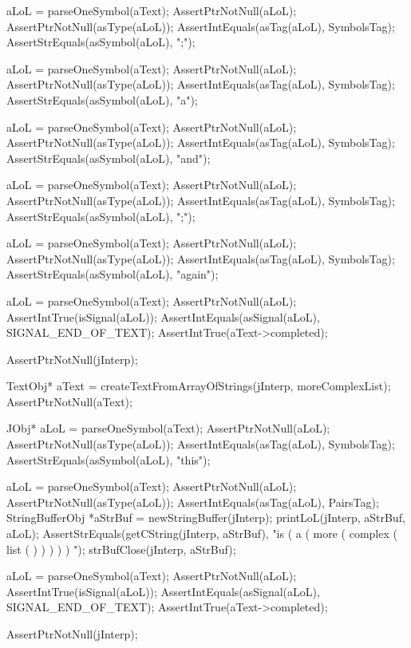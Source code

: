   aLoL = parseOneSymbol(aText);
  AssertPtrNotNull(aLoL);
  AssertPtrNotNull(asType(aLoL));
  AssertIntEquals(asTag(aLoL), SymbolsTag);
  AssertStrEquals(asSymbol(aLoL), ";");

  aLoL = parseOneSymbol(aText);
  AssertPtrNotNull(aLoL);
  AssertPtrNotNull(asType(aLoL));
  AssertIntEquals(asTag(aLoL), SymbolsTag);
  AssertStrEquals(asSymbol(aLoL), "a");

  aLoL = parseOneSymbol(aText);
  AssertPtrNotNull(aLoL);
  AssertPtrNotNull(asType(aLoL));
  AssertIntEquals(asTag(aLoL), SymbolsTag);
  AssertStrEquals(asSymbol(aLoL), "and");

  aLoL = parseOneSymbol(aText);
  AssertPtrNotNull(aLoL);
  AssertPtrNotNull(asType(aLoL));
  AssertIntEquals(asTag(aLoL), SymbolsTag);
  AssertStrEquals(asSymbol(aLoL), ";");

  aLoL = parseOneSymbol(aText);
  AssertPtrNotNull(aLoL);
  AssertPtrNotNull(asType(aLoL));
  AssertIntEquals(asTag(aLoL), SymbolsTag);
  AssertStrEquals(asSymbol(aLoL), "again");

  aLoL = parseOneSymbol(aText);
  AssertPtrNotNull(aLoL);
  AssertIntTrue(isSignal(aLoL));
  AssertIntEquals(asSignal(aLoL), SIGNAL_END_OF_TEXT);
  AssertIntTrue(aText->completed);
\stopCTest
\stopTestCase

\startCTest
  AssertPtrNotNull(jInterp);

  TextObj* aText = createTextFromArrayOfStrings(jInterp, moreComplexList);
  AssertPtrNotNull(aText);

  JObj* aLoL = parseOneSymbol(aText);
  AssertPtrNotNull(aLoL);
  AssertPtrNotNull(asType(aLoL));
  AssertIntEquals(asTag(aLoL), SymbolsTag);
  AssertStrEquals(asSymbol(aLoL), "this");

  aLoL = parseOneSymbol(aText);
  AssertPtrNotNull(aLoL);
  AssertPtrNotNull(asType(aLoL));
  AssertIntEquals(asTag(aLoL), PairsTag);
  StringBufferObj *aStrBuf = newStringBuffer(jInterp);
  printLoL(jInterp, aStrBuf, aLoL);
  AssertStrEquals(getCString(jInterp, aStrBuf),
    "is ( a ( more ( complex ( list ( ) ) ) ) ) ");
  strBufClose(jInterp, aStrBuf);

  aLoL = parseOneSymbol(aText);
  AssertPtrNotNull(aLoL);
  AssertIntTrue(isSignal(aLoL));
  AssertIntEquals(asSignal(aLoL), SIGNAL_END_OF_TEXT);
  AssertIntTrue(aText->completed);
\stopCTest
\stopTestCase

\startCTest
  AssertPtrNotNull(jInterp);

